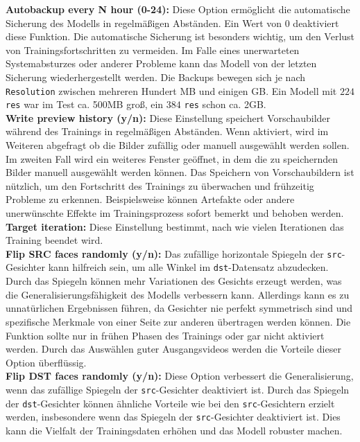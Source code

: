 \textbf{Autobackup every N hour (0-24):} Diese Option ermöglicht die automatische Sicherung des Modells in regelmäßigen Abständen.
Ein Wert von 0 deaktiviert diese Funktion.
Die automatische Sicherung ist besonders wichtig, um den Verlust von Trainingsfortschritten zu vermeiden.
Im Falle eines unerwarteten Systemabsturzes oder anderer Probleme kann das Modell von der letzten Sicherung wiederhergestellt werden.
Die Backups bewegen sich je nach \texttt{Resolution} zwischen mehreren Hundert MB und einigen GB.
Ein Modell mit $224$ \texttt{res} war im Test ca. 500MB groß, ein $384$ \texttt{res} schon ca. 2GB.\\

\textbf{Write preview history (y/n):} Diese Einstellung speichert Vorschaubilder während des Trainings in regelmäßigen Abständen.
Wenn aktiviert, wird im Weiteren abgefragt ob die Bilder zufällig oder manuell ausgewählt werden sollen.
Im zweiten Fall wird ein weiteres Fenster geöffnet, in dem die zu speichernden Bilder manuell ausgewählt werden können.
Das Speichern von Vorschaubildern ist nützlich, um den Fortschritt des Trainings zu überwachen und frühzeitig Probleme zu erkennen.
Beispielsweise können Artefakte oder andere unerwünschte Effekte im Trainingsprozess sofort bemerkt und behoben werden.\\

\textbf{Target iteration:} Diese Einstellung bestimmt, nach wie vielen Iterationen das Training beendet wird.\\

\textbf{Flip SRC faces randomly (y/n):} Das zufällige horizontale Spiegeln der \texttt{src}-Gesichter kann hilfreich sein, um alle Winkel im \texttt{dst}-Datensatz abzudecken.
Durch das Spiegeln können mehr Variationen des Gesichts erzeugt werden, was die Generalisierungsfähigkeit des Modells verbessern kann.
Allerdings kann es zu unnatürlichen Ergebnissen führen, da Gesichter nie perfekt symmetrisch sind und spezifische Merkmale von einer Seite zur anderen übertragen werden können.
Die Funktion sollte nur in frühen Phasen des Trainings oder gar nicht aktiviert werden.
Durch das Auswählen guter Ausgangsvideos werden die Vorteile dieser Option überflüssig.\\

\textbf{Flip DST faces randomly (y/n):} Diese Option verbessert die Generalisierung, wenn das zufällige Spiegeln der \texttt{src}-Gesichter deaktiviert ist.
Durch das Spiegeln der \texttt{dst}-Gesichter können ähnliche Vorteile wie bei den \texttt{src}-Gesichtern erzielt werden, insbesondere wenn das Spiegeln der \texttt{src}-Gesichter deaktiviert ist.
Dies kann die Vielfalt der Trainingsdaten erhöhen und das Modell robuster machen.\\

